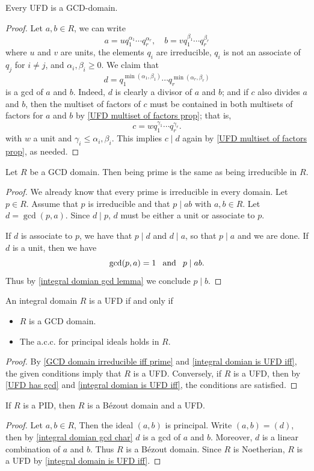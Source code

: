 \begin{proposition}\label{UFD has gcd}
Every UFD is a GCD-domain.
\end{proposition}
\begin{proof}
Let $a,b\in R$, we can write
\[a=uq_1^{\alpha_1}\cdots q_r^{\alpha_r},\quad b=vq_1^{\beta_1}\cdots q_r^{\beta_r}\]
where $u$ and $v$ are units, the elements $q_i$ are irreducible, $q_i$ is not an associate of $q_j$ for $i\neq j$, and $\alpha_i,\beta_i\geq0$. We claim that
\[d=q_1^{\min(\alpha_1,\beta_1)}\cdots q_r^{\min(\alpha_r,\beta_r)}\]
is a gcd of $a$ and $b$. Indeed, $d$ is clearly a divisor of $a$ and $b$; and if $c$ also divides $a$ and $b$, then the multiset of factors of $c$ must be contained in both multisets of factors for $a$ and $b$ by \cref{UFD multiset of factors prop}; that is,
\[c=w q_1^{\gamma_1}\cdots q_r^{\gamma_r}.\]
with $w$ a unit and $\gamma_i\leq\alpha_i,\beta_i$. This implies $c\mid d$ again by \cref{UFD multiset of factors prop}, as needed.
\end{proof}
\begin{proposition}\label{GCD domain irreducible iff prime}
Let $R$ be a GCD domain. Then being prime is the same as being irreducible in $R$.
\end{proposition}
\begin{proof}
We already know that every prime is irreducible in every domain. Let $p\in R$. Assume that $p$ is irreducible and that $p\mid ab$ with $a,b\in R$. Let $d=\gcd(p,a)$. Since $d\mid p$, $d$ must be either a unit or associate to $p$.\par
If $d$ is associate to $p$, we have that $p\mid d$ and $d\mid a$, so that $p\mid a$ and we are done. If $d$ is a unit, then we have
\[\gcd(p,a)=1\hspace{8pt}\text{and}\hspace{8pt} p\mid ab.\]
Thus by \cref{integral domian gcd lemma} we conclude $p\mid b$.
\end{proof}
\begin{theorem}\label{integral domain is UFD iff}
An integral domain $R$ is a UFD if and only if
\begin{itemize}
\item $R$ is a GCD domain.
\item The a.c.c. for principal ideals holds in $R$.
\end{itemize}
\end{theorem}
\begin{proof}
By \cref{GCD domain irreducible iff prime} and \cref{integral domian is UFD iff}, the given conditions imply that $R$ is a UFD. Conversely, if $R$ is a UFD, then by \cref{UFD has gcd} and \cref{integral domian is UFD iff}, the conditions are satisfied.
\end{proof}
\begin{theorem}
If $R$ is a PID, then $R$ is a B\'ezout domain and a UFD.
\end{theorem}
\begin{proof}
Let $a,b\in R$, Then the ideal $(a,b)$ is principal. Write $(a,b)=(d)$, then by \cref{integral domian gcd char} $d$ is a gcd of $a$ and $b$. Moreover, $d$ is a linear combination of $a$ and $b$. Thus $R$ is a B\'ezout domain. Since $R$ is Noetherian, $R$ is a UFD by \cref{integral domain is UFD iff}.
\end{proof}

